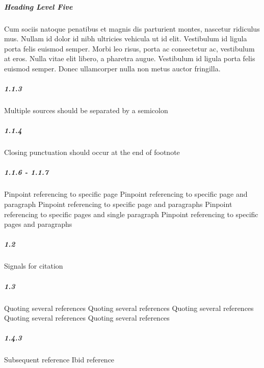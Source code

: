 \documentclass[a4paper,12pt]{article}
\begin{document}
\subparagraph{Heading Level Five}

Cum sociis natoque penatibus et magnis dis parturient montes, nascetur ridiculus mus. Nullam id dolor id nibh ultricies vehicula ut id elit. Vestibulum id ligula porta felis euismod semper. Morbi leo risus, porta ac consectetur ac, vestibulum at eros. Nulla vitae elit libero, a pharetra augue. Vestibulum id ligula porta felis euismod semper. Donec ullamcorper nulla non metus auctor fringilla.


\subparagraph{1.1.3}
Multiple sources should be separated by a semicolon \cites{bakker1980}{tang2008}

\subparagraph{1.1.4}
Closing punctuation should occur at the end of footnote\cite{masters2008}

\subparagraph{1.1.6 - 1.1.7}
Pinpoint referencing to specific page \cite[2]{tang2008}
Pinpoint referencing to specific page and paragraph \cite[]{bakker1980}
Pinpoint referencing to specific page and paragraphs \cite[]{agcth2005}
Pinpoint referencing to specific pages and single paragraph \cite[2--3 ]{russel1661a}
Pinpoint referencing to specific pages and paragraphs \cite[2--4]{tang2008}


\subparagraph{1.2}
Signals for citation \cite[See][2]{beckman1988}


\subparagraph{1.3}
Quoting several references 
Quoting several references 
Quoting several references 
Quoting several references 
Quoting several references 

\subparagraph{1.4.3}

Subsequent reference \cite[2-2]{masters2008}
Ibid reference \cite[2]{masters2008}
\end{document}
